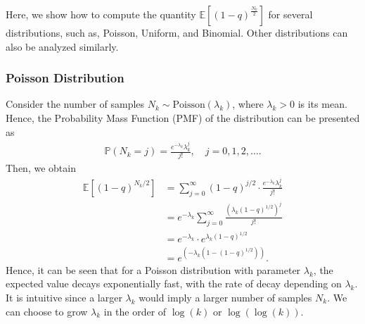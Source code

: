\documentclass{article}
\newcommand{\EXP}[1]
{\mathbb{E}\!\left[#1\right] }
\theoremstyle{plain}
\theoremstyle{definition}
\theoremstyle{remark}
\begin{document}
Here, we show how to compute the quantity $\EXP{(1-q)^{\frac{N_{k}}{2}}}$ for several distributions, such as, Poisson, Uniform, and Binomial. Other distributions can also be analyzed similarly.

\subsubsection{Poisson Distribution}\label{appdx_poisson_dist}

Consider the number of samples $N_k \sim \text{Poisson}(\lambda_k)$, where $\lambda_k>0$ is its mean. Hence, the Probability Mass Function (PMF) of the distribution can be presented as
\begin{align*}
    \mathbb{P}(N_k = j) = \frac{e^{-\lambda_k} \lambda_k^j}{j!}, \quad j = 0, 1, 2, \ldots .
\end{align*}
Then, we obtain
\begin{align*}
    \EXP{(1 - q)^{N_k/2}}
    &= \sum_{j=0}^\infty (1 - q)^{j/2} \cdot \frac{e^{-\lambda_k} \lambda_k^j}{j!} \\
    &= e^{-\lambda_k} \sum_{j=0}^\infty 
    \frac{\left(\lambda_k (1 - q)^{1/2} \right)^j}{j!} \\
    &= e^{-\lambda_k} \cdot e^{\lambda_k (1 - q)^{1/2}} \\
    &= e^{\left(-\lambda_k \left(1 - (1 - q)^{1/2} \right) \right)} .
\end{align*}
%
%
Hence, it can be seen that for a Poisson distribution with parameter $\lambda_k$, the expected value decays exponentially fast, with the rate of decay depending on $\lambda_k$. It is intuitive since a larger $\lambda_k$ would imply a larger number of samples $N_k$. 
We can choose to grow $\lambda_k$ in the order of $\log(k)$ or $\log(\log(k))$.
\end{document}
